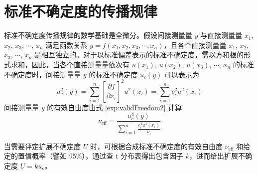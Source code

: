     \section{标准不确定度的传播规律}
    标准不确定度传播规律的数学基础是全微分。假设间接测量量 $y$ 与直接测量量 $x_1$, $x_2$, $x_3$, $\cdots$, $x_n$ 满足函数关系 $y = f(x_1,x_2,x_3,\cdots,x_n)$，且各个直接测量量 $x_1$, $x_2$, $x_3$, $\cdots$, $x_n$ 是相互独立的。对于以标准偏差表示的标准不确定度，需以方和根的形式求和，因此，当各个直接测量量依次有 $u(x_1)$, $u(x_2)$, $u(x_3)$, $\cdots$, $x_n$ 的标准不确定度时，间接测量量 $y$ 的标准不确定度 $u_c(y)$ 可以表示为
    \begin{equation}
        u_c^2(y)=\sum_{i=1}^{n}\left[\frac{\partial f}{\partial x_i}\right]^{2}u^2\left(x_{i}\right)=\sum_{i=1}^{n}c_i^2 u^2\left(x_{i}\right) \label{exp:uncertaintyPropagation}
    \end{equation}
    间接测量量 $y$ 的有效自由度由式 \ref{exp:validFreedom2} 计算
    \begin{equation}
        \nu_\text{eff}=\frac{u_c^4(y)}{\displaystyle\sum_{i=1}^{n}\frac{c_i^4 u^4(x_i)}{\nu_i}} \label{exp:validFreedom2}
    \end{equation}

    当需要评定扩展不确定度 $U$ 时，可根据合成标准不确定度的有效自由度 $\nu_\text{eff}$ 和给定的置信概率（譬如 95\%），通过查 t 分布表得出包含因子 $k$，进而给出扩展不确定度 $U = k u_c$。
